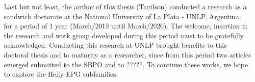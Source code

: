 Last but not least, the author of this thesis (Tanilson) conducted a research as a sandwich doctorate at the National University of La Plata - UNLP, Argentina, for a period of 1 year (March/2019 until March/2020). The welcome, insertion in the research and work group developed during this period must to be gratefully acknowledged. Conducting this research at UNLP brought benefits to this doctoral thesis and to maturity as a researcher, since from this period two articles emerged submitted to the SBPO and to ?????. To continue these works, we hope to explore the Helly-EPG subfamilies.






